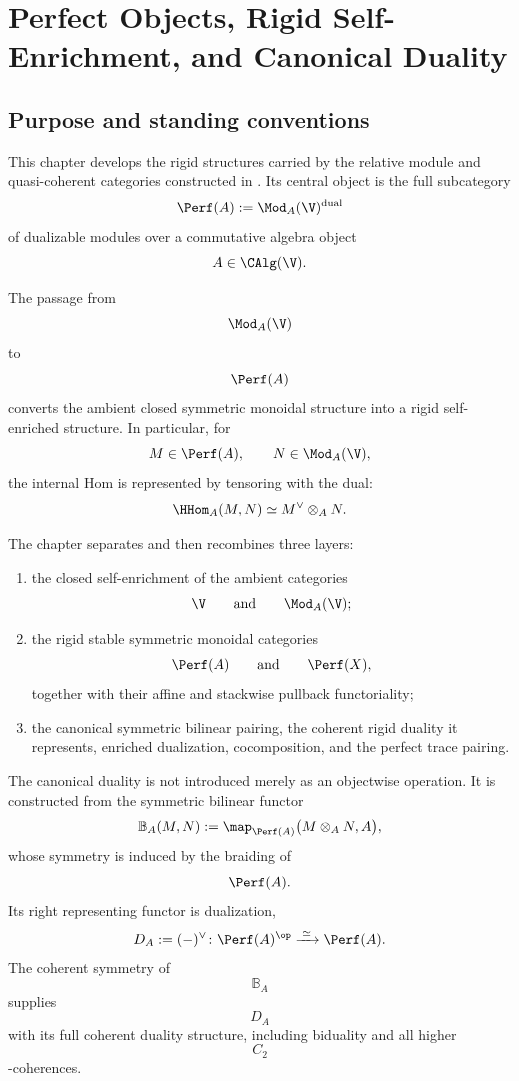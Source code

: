 \chapter{Perfect Objects, Rigid Self-Enrichment, and Canonical Duality}
\label{chap:perfect-rigid-enrichment}
\label{chap:perfect-rigid-poincare}

\section{Purpose and standing conventions}
\label{sec:perfect-rigid-purpose}
\label{sec:perfect-poincare-purpose}

This chapter develops the rigid structures carried by the relative module
and quasi-coherent categories constructed in
. Its central object is the full
subcategory
\[
    \Perf(A)
    :=
    \Mod_A(\V)^{\mathrm{dual}}
\]
of dualizable modules over a commutative algebra object
\[
    A\in\CAlg(\V).
\]

The passage from
\[
    \Mod_A(\V)
\]
to
\[
    \Perf(A)
\]
converts the ambient closed symmetric monoidal structure into a rigid
self-enriched structure. In particular, for
\[
    M\in\Perf(A),
    \qquad
    N\in\Mod_A(\V),
\]
the internal Hom is represented by tensoring with the dual:
\[
    \HHom_A(M,N)
    \simeq
    M^\vee\otimes_A N.
\]

The chapter separates and then recombines three layers:
\begin{enumerate}[label=(\roman*)]
    \item the closed self-enrichment of the ambient categories
    \[
        \V
        \qquad\text{and}\qquad
        \Mod_A(\V);
    \]

    \item the rigid stable symmetric monoidal categories
    \[
        \Perf(A)
        \qquad\text{and}\qquad
        \Perf(X),
    \]
    together with their affine and stackwise pullback functoriality;

    \item the canonical symmetric bilinear pairing, the coherent rigid
    duality it represents, enriched dualization, cocomposition, and the
    perfect trace pairing.
\end{enumerate}

The canonical duality is not introduced merely as an objectwise operation.
It is constructed from the symmetric bilinear functor
\[
    \mathbb B_A(M,N)
    :=
    \map_{\Perf(A)}
    \bigl(
        M\otimes_A N,
        A
    \bigr),
\]
whose symmetry is induced by the braiding of
\[
    \Perf(A).
\]
Its right representing functor is dualization,
\[
    D_A
    :=
    (-)^\vee
    \colon
    \Perf(A)^{\op}
    \xrightarrow{\;\simeq\;}
    \Perf(A).
\]
The coherent symmetry of
\[
    \mathbb B_A
\]
supplies
\[
    D_A
\]
with its full coherent duality structure, including biduality and all
higher
\[
    C_2
\]
-coherences.

